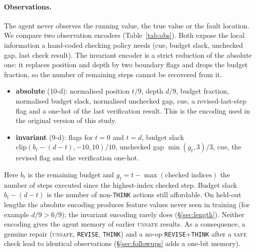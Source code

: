\paragraph{Observations.}
The agent never observes the running value, the true value or the fault location. We compare two observation encoders (Table~\ref{tab:obs}). Both expose the local information a hand-coded checking policy needs (cue, budget slack, unchecked gap, last check result). The invariant encoder is a strict reduction of the absolute one: it replaces position and depth by two boundary flags and drops the budget fraction, so the number of remaining steps cannot be recovered from it.
\begin{itemize}
  \item \textbf{absolute} (10-d): normalised position $t/9$, depth $d/9$, budget fraction, normalised budget slack, normalised unchecked gap, cue, a revised-last-step flag and a one-hot of the last verification result. This is the encoding used in the original version of this study.
  \item \textbf{invariant} (9-d): flags for $t=0$ and $t=d$, budget slack $\mathrm{clip}(b_t-(d-t), -10, 10)/10$, unchecked gap $\min(g_t, 3)/3$, cue, the revised flag and the verification one-hot.
\end{itemize}
Here $b_t$ is the remaining budget and $g_t = t - \max(\text{checked indices})$ the number of steps executed since the highest-index checked step. Budget slack $b_t - (d - t)$ is the number of non-\texttt{THINK} actions still affordable. On held-out lengths the absolute encoding produces feature values never seen in training (for example $d/9 > 6/9$); the invariant encoding rarely does (\S\ref{sec:length}). Neither encoding gives the agent memory of earlier \textsc{unsafe} results. As a consequence, a genuine repair (\textsc{unsafe}, \texttt{REVISE}, \texttt{THINK}) and a no-op \texttt{REVISE}+\texttt{THINK} after a \textsc{safe} check lead to identical observations (\S\ref{sec:followups} adds a one-bit memory).

\begin{table}[t]
\centering
\small
\caption{Observation features. The invariant encoder replaces absolute position and length by boundary flags, so remaining length cannot be recovered from it.}
\label{tab:obs}
\end{table}


